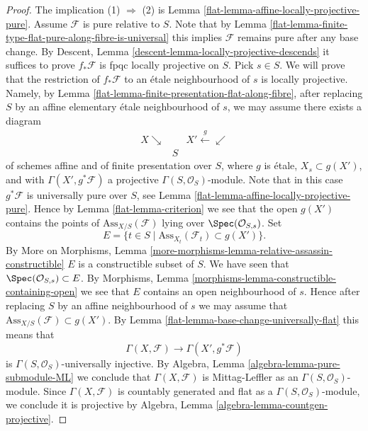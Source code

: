 \begin{proof}

The implication (1) $\Rightarrow$ (2) is
Lemma \ref{flat-lemma-affine-locally-projective-pure}.
Assume $\mathcal{F}$ is pure relative to $S$.
Note that by
Lemma \ref{flat-lemma-finite-type-flat-pure-along-fibre-is-universal}
this implies $\mathcal{F}$ remains pure after any base change. By
Descent, Lemma \ref{descent-lemma-locally-projective-descends}
it suffices to prove $f_*\mathcal{F}$ is fpqc locally projective on $S$.
Pick $s \in S$. We will prove that the restriction of
$f_*\mathcal{F}$ to an \'etale neighbourhood of $s$ is locally projective.
Namely, by
Lemma \ref{flat-lemma-finite-presentation-flat-along-fibre},
after replacing $S$ by an affine elementary \'etale
neighbourhood of $s$, we may assume there exists a diagram
$$
\begin{array}{ccc}X \searrow &  & X' \overset{g}{\longleftarrow}\swarrow \\  & S & \end{array}
$$
of schemes affine and of finite presentation over $S$,
where $g$ is \'etale, $X_s \subset g(X')$, and with
$\Gamma(X', g^*\mathcal{F})$ a projective $\Gamma(S, \mathcal{O}_S)$-module.
Note that in this case $g^*\mathcal{F}$ is universally pure over $S$, see
Lemma \ref{flat-lemma-affine-locally-projective-pure}.
Hence by
Lemma \ref{flat-lemma-criterion}
we see that the open $g(X')$ contains the points of
$\text{Ass}_{X/S}(\mathcal{F})$ lying over $\Spec(\mathcal{O}_{S, s})$.
Set
$$
E = \{t \in S \mid \text{Ass}_{X_t}(\mathcal{F}_t) \subset g(X') \}.
$$
By
More on Morphisms,
Lemma \ref{more-morphisms-lemma-relative-assassin-constructible}
$E$ is a constructible subset of $S$. We have seen that
$\Spec(\mathcal{O}_{S, s}) \subset E$. By
Morphisms, Lemma \ref{morphisms-lemma-constructible-containing-open}
we see that $E$ contains an open neighbourhood of $s$. Hence after
replacing $S$ by an affine neighbourhood of $s$ we may assume that
$\text{Ass}_{X/S}(\mathcal{F}) \subset g(X')$.
By
Lemma \ref{flat-lemma-base-change-universally-flat}
this means that
$$
\Gamma(X, \mathcal{F}) \longrightarrow \Gamma(X', g^*\mathcal{F})
$$
is $\Gamma(S, \mathcal{O}_S)$-universally injective.
By Algebra, Lemma \ref{algebra-lemma-pure-submodule-ML}
we conclude that $\Gamma(X, \mathcal{F})$ is Mittag-Leffler as an
$\Gamma(S, \mathcal{O}_S)$-module. Since
$\Gamma(X, \mathcal{F})$ is countably generated and flat as a
$\Gamma(S, \mathcal{O}_S)$-module, we conclude
it is projective by
Algebra, Lemma \ref{algebra-lemma-countgen-projective}.
\end{proof}

